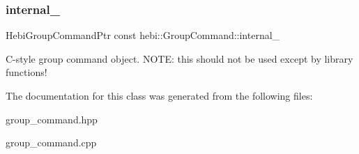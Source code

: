 \subsubsection{\texorpdfstring{internal\+\_\+}{internal\_}}
{\footnotesize\ttfamily Hebi\+Group\+Command\+Ptr const hebi\+::\+Group\+Command\+::internal\+\_\+}

C-\/style group command object. N\+O\+TE\+: this should not be used except by library functions! 

The documentation for this class was generated from the following files\+:\begin{DoxyCompactItemize}
\item 
group\+\_\+command.\+hpp\item 
group\+\_\+command.\+cpp\end{DoxyCompactItemize}
